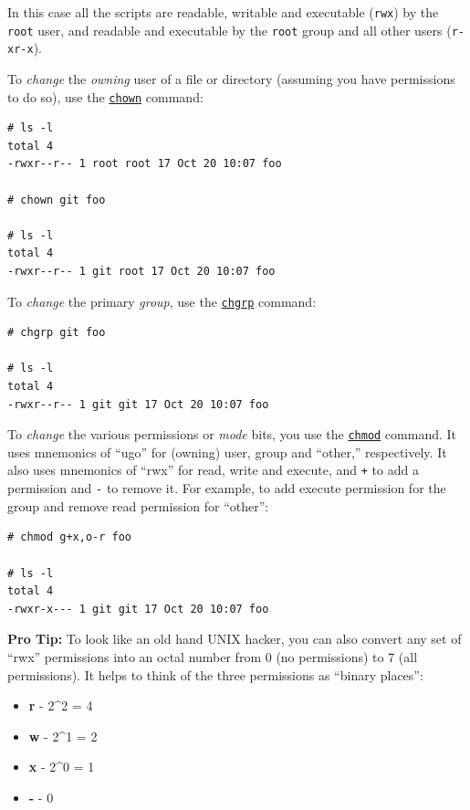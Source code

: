\documentclass[10pt,]{book}
\numberwithin{figure}{chapter}
\begin{document}
In this case all the scripts are readable, writable and executable
(\texttt{rwx}) by the \texttt{root} user, and readable and executable by
the \texttt{root} group and all other users (\texttt{r-xr-x}).

To \emph{change} the \emph{owning} user of a file or directory (assuming
you have permissions to do so), use the
\href{http://linux.die.net/man/1/chown}{\texttt{chown}} command:

\begin{verbatim}
# ls -l
total 4
-rwxr--r-- 1 root root 17 Oct 20 10:07 foo

# chown git foo

# ls -l
total 4
-rwxr--r-- 1 git root 17 Oct 20 10:07 foo
\end{verbatim}

To \emph{change} the primary \emph{group}, use the
\href{http://linux.die.net/man/1/chgrp}{\texttt{chgrp}} command:

\begin{verbatim}
# chgrp git foo

# ls -l
total 4
-rwxr--r-- 1 git git 17 Oct 20 10:07 foo
\end{verbatim}

To \emph{change} the various permissions or \emph{mode} bits, you use
the \href{http://linux.die.net/man/1/chmod}{\texttt{chmod}} command. It
uses mnemonics of ``ugo'' for (owning) user, group and ``other,''
respectively. It also uses mnemonics of ``rwx'' for read, write and
execute, and \texttt{+} to add a permission and \texttt{-} to remove it.
For example, to add execute permission for the group and remove read
permission for ``other'':

\begin{verbatim}
# chmod g+x,o-r foo

# ls -l
total 4
-rwxr-x--- 1 git git 17 Oct 20 10:07 foo
\end{verbatim}

\textbf{Pro Tip:} To look like an old hand UNIX hacker, you can also
convert any set of ``rwx'' permissions into an octal number from 0 (no
permissions) to 7 (all permissions). It helps to think of the three
permissions as ``binary places'':

\begin{itemize}
\itemsep1pt\parskip0pt
\item
  \textbf{r} - 2\^{}2 = 4
\item
  \textbf{w} - 2\^{}1 = 2
\item
  \textbf{x} - 2\^{}0 = 1
\item
  \textbf{-} - 0
\end{itemize}
\end{document}
